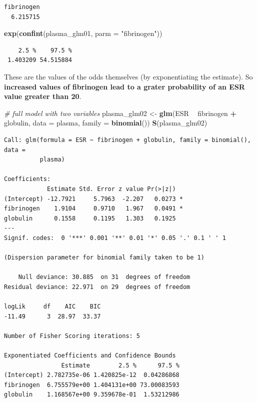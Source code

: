 \documentclass[
]{article}
\newenvironment{Shaded}{\begin{snugshade}}{\end{snugshade}}
\newcommand{\CommentTok}[1]{\textcolor[rgb]{0.56,0.35,0.01}{\textit{#1}}}
\newcommand{\DataTypeTok}[1]{\textcolor[rgb]{0.13,0.29,0.53}{#1}}
\newcommand{\KeywordTok}[1]{\textcolor[rgb]{0.13,0.29,0.53}{\textbf{#1}}}
\newcommand{\NormalTok}[1]{#1}
\newcommand{\OperatorTok}[1]{\textcolor[rgb]{0.81,0.36,0.00}{\textbf{#1}}}
\newcommand{\StringTok}[1]{\textcolor[rgb]{0.31,0.60,0.02}{#1}}
\begin{document}
\begin{verbatim}
fibrinogen 
  6.215715 
\end{verbatim}

\begin{Shaded}
\begin{Highlighting}[]
\KeywordTok{exp}\NormalTok{(}\KeywordTok{confint}\NormalTok{(plasma_glm01, }\DataTypeTok{parm =} \StringTok{"fibrinogen"}\NormalTok{))}
\end{Highlighting}
\end{Shaded}

\begin{verbatim}
    2.5 %    97.5 % 
 1.403209 54.515884 
\end{verbatim}

These are the values of the odds themselves (by exponentiating the
estimate). So \textbf{increased values of fibrinogen lead to a grater
probability of an ESR value greater than 20}.

\begin{Shaded}
\begin{Highlighting}[]
\CommentTok{# full model with two variables}
\NormalTok{plasma_glm02 <-}\StringTok{ }\KeywordTok{glm}\NormalTok{(ESR }\OperatorTok{~}\StringTok{ }\NormalTok{fibrinogen }\OperatorTok{+}\StringTok{ }\NormalTok{globulin, }\DataTypeTok{data =}\NormalTok{ plasma, }\DataTypeTok{family =} \KeywordTok{binomial}\NormalTok{())}
\KeywordTok{S}\NormalTok{(plasma_glm02)}
\end{Highlighting}
\end{Shaded}

\begin{verbatim}
Call: glm(formula = ESR ~ fibrinogen + globulin, family = binomial(), data =
          plasma)

Coefficients:
            Estimate Std. Error z value Pr(>|z|)  
(Intercept) -12.7921     5.7963  -2.207   0.0273 *
fibrinogen    1.9104     0.9710   1.967   0.0491 *
globulin      0.1558     0.1195   1.303   0.1925  
---
Signif. codes:  0 '***' 0.001 '**' 0.01 '*' 0.05 '.' 0.1 ' ' 1

(Dispersion parameter for binomial family taken to be 1)

    Null deviance: 30.885  on 31  degrees of freedom
Residual deviance: 22.971  on 29  degrees of freedom

logLik     df    AIC    BIC 
-11.49      3  28.97  33.37 

Number of Fisher Scoring iterations: 5

Exponentiated Coefficients and Confidence Bounds
                Estimate        2.5 %      97.5 %
(Intercept) 2.782735e-06 1.420825e-12  0.04286868
fibrinogen  6.755579e+00 1.404131e+00 73.00083593
globulin    1.168567e+00 9.359678e-01  1.53212986
\end{verbatim}
\end{document}
